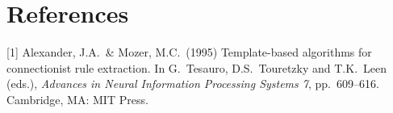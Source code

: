 \documentclass{article}
\begin{document}






\section*{References}


\small

[1] Alexander, J.A.\ \& Mozer, M.C.\ (1995) Template-based algorithms for
connectionist rule extraction. In G.\ Tesauro, D.S.\ Touretzky and T.K.\ Leen
(eds.), {\it Advances in Neural Information Processing Systems 7},
pp.\ 609--616. Cambridge, MA: MIT Press.
\end{document}
